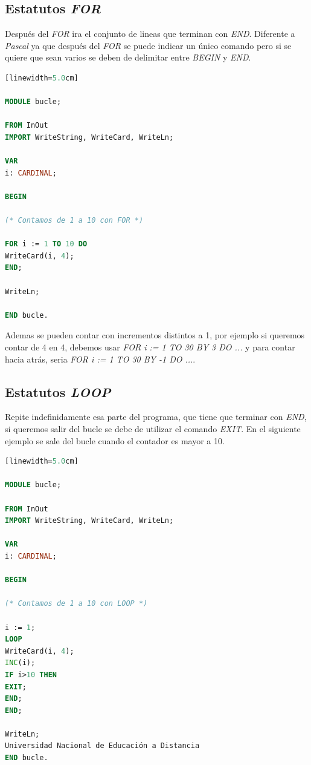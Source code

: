 \documentclass[10pt,journal,compsoc]{IEEEtran}
\begin{document}
\subsection{Estatutos \emph{FOR}}
Despu\'es del \emph{FOR} ira el conjunto de lineas que terminan con \emph{END}. Diferente a \emph{Pascal} ya que despu\'es del \emph{FOR} se puede indicar un \'unico comando pero si se quiere que sean varios se deben de delimitar entre \emph{BEGIN} y \emph{END}.
\begin{lstlisting}[language=Modula-2, caption = {Sintaxis de un FOR}][linewidth=5.0cm]

MODULE bucle;

FROM InOut 
IMPORT WriteString, WriteCard, WriteLn;

VAR 
i: CARDINAL;

BEGIN

(* Contamos de 1 a 10 con FOR *)

FOR i := 1 TO 10 DO 
WriteCard(i, 4); 
END;

WriteLn;

END bucle. 

\end{lstlisting}
Ademas se pueden contar con incrementos distintos a 1, por ejemplo si queremos contar de 4 en 4, debemos usar \emph{FOR i := 1 TO 30 BY 3 DO ...}
y para contar hacia atr\'as, seria \emph{FOR i := 1 TO 30 BY -1 DO ...}.


\subsection{Estatutos \emph{LOOP}}
Repite indefinidamente esa parte del programa, que tiene que terminar con \emph{END}, si queremos salir del bucle se debe de utilizar el comando \emph{EXIT}. En el siguiente ejemplo se sale del bucle cuando el contador es mayor a 10.
\begin{lstlisting}[language=Modula-2, caption = {Sintaxis de un LOOP}][linewidth=5.0cm]

MODULE bucle;

FROM InOut 
IMPORT WriteString, WriteCard, WriteLn;

VAR 
i: CARDINAL;

BEGIN

(* Contamos de 1 a 10 con LOOP *)

i := 1; 
LOOP 
WriteCard(i, 4); 
INC(i); 
IF i>10 THEN 
EXIT; 
END; 
END;

WriteLn;
Universidad Nacional de Educación a Distancia
END bucle. 

\end{lstlisting}
\end{document}
